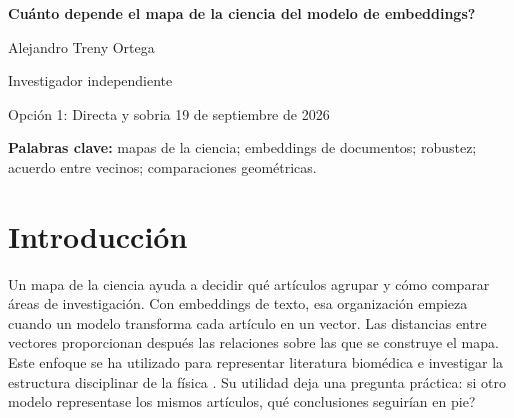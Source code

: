 \documentclass[12pt]{article}
\begin{document}
\begin{center}
{\LARGE\bfseries \textquestiondown{}Cuánto depende el mapa de la ciencia del modelo de embeddings?\par}
\vspace{12pt}
{\large Alejandro Treny Ortega\par}
\smallskip
Investigador independiente\par
\medskip
{\small Opción 1: Directa y sobria \textbullet{} 19 de septiembre de 2026\par}
\end{center}

\begin{abstract}
Un mapa de la ciencia resulta útil si podemos interpretar sus conclusiones con cierta confianza en cómo se ha construido. Aquí, diez modelos de embeddings representan el mismo corpus fijo de 500.000 registros de OpenAlex, de 26 áreas y del período 2000--2024. Las muestras emparejadas comparan centros de áreas, estructura interna y vecinos próximos; después varían el texto de entrada y las reglas de representación. Los modelos comparten una estructura general, pero conservan de media solo el 30,3\% de los 25 vecinos más próximos dentro de los grupos de área y período. Quitar el resumen cambia los vecinos casi tanto como cambiar de modelo; quitar el título cambia menos. Una comparación exploratoria de las 325 parejas de áreas encuentra órdenes opuestos persistentes entre modelos en 262 parejas para la apertura angular y 221 para la dimensión lineal efectiva. Al exigir diferencias relativas superiores al 5\%, quedan 96 y 177. Las medidas alternativas conservan muchas oposiciones, mientras que el centrado y la combinación de las salidas afectan a su persistencia. Son resultados geométricos, sin una prueba externa de corrección temática. Una comparación puede resistir la selección repetida de artículos e invertirse al cambiar de modelo. La evaluación de robustez debería seguir la conclusión concreta que se extrae del mapa, junto con su acuerdo general con otros mapas.
\end{abstract}
\textbf{Palabras clave:} mapas de la ciencia; embeddings de documentos; robustez; acuerdo entre vecinos; comparaciones geométricas.

\section{Introducción}
Un mapa de la ciencia ayuda a decidir qué artículos agrupar y cómo comparar áreas de investigación. Con embeddings de texto, esa organización empieza cuando un modelo transforma cada artículo en un vector. Las distancias entre vectores proporcionan después las relaciones sobre las que se construye el mapa. Este enfoque se ha utilizado para representar literatura biomédica e investigar la estructura disciplinar de la física \citep{refbe130e2973,refc0e2cc29e0}. Su utilidad deja una pregunta práctica: si otro modelo representase los mismos artículos, \textquestiondown{}qué conclusiones seguirían en pie?
\end{document}
